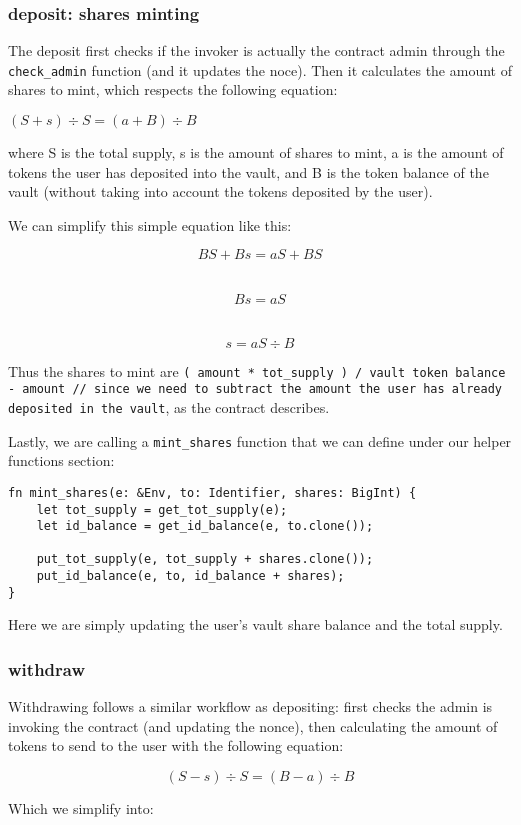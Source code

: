 \documentclass{article}
\newcommand{\inl}[1]{\lstinline{#1}}
\begin{document}
\subsubsection{deposit: shares minting}
The deposit first checks if the invoker is actually the contract admin through the \inl{check_admin} function (and it updates the noce). Then it calculates the amount of shares to mint, which respects the following equation:

\( ( S + s ) \div S = ( a + B ) \div B \)

where S is the total supply, s is the amount of shares to mint, a is the amount of tokens the user has deposited into the vault, and B is the token balance of the vault (without taking into account the tokens deposited by the user).

We can simplify this simple equation like this:

\[ BS + Bs = aS + BS \]
\

\[ Bs = aS \]
\

\[ s = aS \div B \]

Thus the shares to mint are \inl{( amount * tot_supply ) / vault token balance - amount // since we need to subtract the amount the user has already deposited in the vault}, as the contract describes.

Lastly, we are calling a \inl{mint_shares} function that we can define under our helper functions section:

\begin{lstlisting}
fn mint_shares(e: &Env, to: Identifier, shares: BigInt) {
    let tot_supply = get_tot_supply(e);
    let id_balance = get_id_balance(e, to.clone());

    put_tot_supply(e, tot_supply + shares.clone());
    put_id_balance(e, to, id_balance + shares);
}
\end{lstlisting}

Here we are simply updating the user's vault share balance and the total supply.

\subsubsection{withdraw}
Withdrawing follows a similar workflow as depositing: first checks the admin is invoking the contract (and updating the nonce), then calculating the amount of tokens to send to the user with the following equation:

\[ ( S - s ) \div S = ( B - a ) \div B \]

Which we simplify into:
\end{document}

